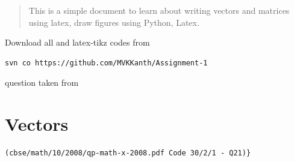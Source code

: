 \documentclass[journal,12pt,twocolumn]{IEEEtran}
\begin{document}
\newpage
\bigskip
\renewcommand{\thefigure}{\theenumi}
\renewcommand{\thetable}{\theenumi}
\begin{abstract}
This is a simple document to learn about writing vectors and matrices using latex, draw figures using Python, Latex.
\end{abstract}
%
Download all and latex-tikz codes from 
%
\begin{lstlisting}
svn co https://github.com/MVKKanth/Assignment-1
\end{lstlisting}
%
question taken from
\section{Vectors}
%
\begin{lstlisting}
(cbse/math/10/2008/qp-math-x-2008.pdf Code 30/2/1 - Q21)}\end{lstlisting}
%
\renewcommand{\theequation}{\theenumi}
\end{document}
